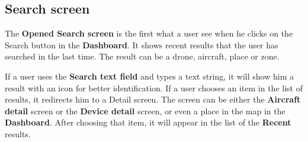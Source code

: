 \subsection{Search screen}\label{subsec:search-screen}
The \textbf{Opened Search screen} is the first what a user see when he clicks on the Search button in the \textbf{Dashboard}.
It shows recent results that the user has searched in the last time.
The result can be a drone, aircraft, place or zone.

If a user uses the \textbf{Search text field} and types a text string, it will show him a result with an icon for better identification.
If a user chooses an item in the list of results, it redirects him to a Detail screen.
The screen can be either the \textbf{Aircraft detail} screen or the \textbf{Device detail} screen, or even a place in the map in the \textbf{Dashboard}.
After choosing that item, it will appear in the list of the \textbf{Recent} results.
